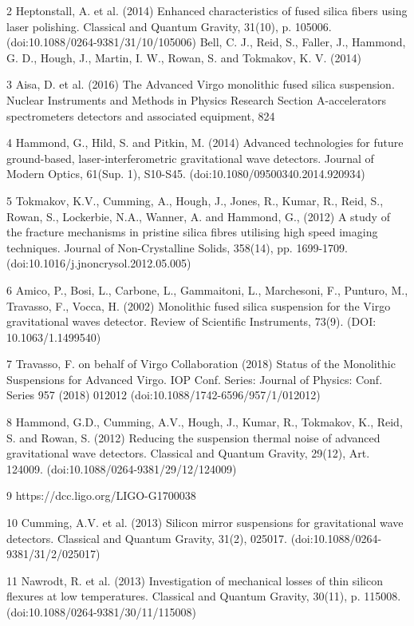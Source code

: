 2 Heptonstall, A. et al. (2014) Enhanced characteristics of fused silica fibers using laser polishing. Classical and Quantum Gravity, 31(10), p. 105006. (doi:10.1088/0264-9381/31/10/105006)
Bell, C. J., Reid, S., Faller, J., Hammond, G. D., Hough, J., Martin, I. W., Rowan, S. and Tokmakov, K. V. (2014) 

3 Aisa, D. et al. (2016) The Advanced Virgo monolithic fused silica suspension. Nuclear Instruments and Methods in Physics Research Section A-accelerators spectrometers detectors and associated equipment, 824

4 Hammond, G., Hild, S. and Pitkin, M. (2014) Advanced technologies for future ground-based, laser-interferometric gravitational wave detectors. Journal of Modern Optics, 61(Sup. 1), S10-S45. (doi:10.1080/09500340.2014.920934)

5 Tokmakov, K.V., Cumming, A., Hough, J., Jones, R., Kumar, R., Reid, S., Rowan, S., Lockerbie, N.A., Wanner, A. and Hammond, G., (2012) A study of the fracture mechanisms in pristine silica fibres utilising high speed imaging techniques. Journal of Non-Crystalline Solids, 358(14), pp. 1699-1709. 
(doi:10.1016/j.jnoncrysol.2012.05.005)

6 Amico, P., Bosi, L., Carbone, L., Gammaitoni, L., Marchesoni, F., Punturo, M., Travasso, F., Vocca, H. (2002) Monolithic fused silica suspension for the Virgo gravitational waves detector. Review of Scientific Instruments, 73(9). (DOI: 10.1063/1.1499540)

7 Travasso, F. on behalf of Virgo Collaboration (2018) Status of the Monolithic Suspensions for Advanced Virgo. IOP Conf. Series: Journal of Physics: Conf. Series 957 (2018) 012012  (doi:10.1088/1742-6596/957/1/012012)

8 Hammond, G.D., Cumming, A.V., Hough, J., Kumar, R., Tokmakov, K., Reid, S. and Rowan, S. (2012) Reducing the suspension thermal noise of advanced gravitational wave detectors. Classical and Quantum Gravity, 29(12), Art. 124009. (doi:10.1088/0264-9381/29/12/124009)

9 https://dcc.ligo.org/LIGO-G1700038

10 Cumming, A.V. et al. (2013) Silicon mirror suspensions for gravitational wave detectors. Classical and Quantum Gravity, 31(2), 025017. (doi:10.1088/0264-9381/31/2/025017)

11 Nawrodt, R. et al. (2013) Investigation of mechanical losses of thin silicon flexures at low temperatures. Classical and Quantum Gravity, 30(11), p. 115008. (doi:10.1088/0264-9381/30/11/115008)

